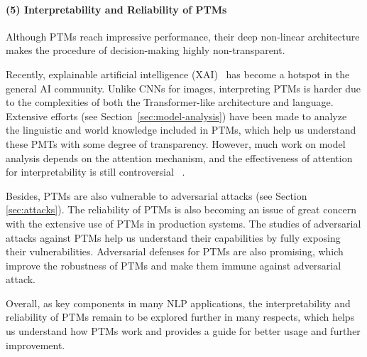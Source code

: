 \documentclass[fleqn]{SCYE-arxiv}
\begin{document}
\begin{multicols}{2}



\paragraph{(5) Interpretability and Reliability of PTMs}

Although PTMs reach impressive performance, their deep non-linear architecture makes the procedure of decision-making highly non-transparent.

Recently, explainable artificial intelligence (XAI)~\cite{arrieta2020explainable} has become a hotspot in the general AI community. Unlike CNNs for images, interpreting PTMs is harder due to the complexities of both the Transformer-like architecture and language.
Extensive efforts (see Section~\ref{sec:model-analysis}) have been made to analyze the linguistic and world knowledge included in PTMs, which help us understand these PMTs with some degree of transparency.
However, much work on model analysis depends
on the attention mechanism, and the effectiveness of attention for interpretability is still controversial ~\cite{jain2019attention,serrano2019attention}.

Besides, PTMs are also  vulnerable to adversarial attacks (see Section \ref{sec:attacks}). The reliability of PTMs is also becoming an issue of great concern with the extensive use of PTMs in production systems.
The studies of adversarial attacks against PTMs help us understand their capabilities by fully exposing their vulnerabilities. Adversarial defenses for PTMs are also promising, which improve the robustness of PTMs and make them immune against adversarial attack.

Overall, as key components in many NLP applications, the interpretability and reliability  of PTMs remain to be explored further in many respects, which helps us
understand how PTMs work and provides a guide for better usage and further improvement.


\end{multicols}
\end{document}
